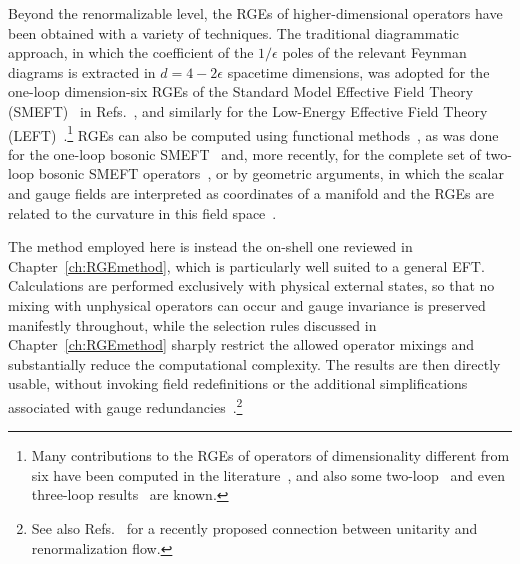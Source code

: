 Beyond the renormalizable level, the RGEs of higher-dimensional operators have been obtained with a
variety of techniques. The traditional diagrammatic approach, in which the coefficient of the
$1/\epsilon$ poles of the relevant Feynman diagrams is extracted in $d=4-2\epsilon$ spacetime
dimensions, was adopted for the one-loop dimension-six RGEs of the
Standard Model Effective Field Theory (SMEFT)~\cite{Buchmuller:1985jz,Grzadkowski:2010es,Brivio:2017vri,Isidori:2023pyp} in
Refs.~\cite{Jenkins:2013zja,Jenkins:2013wua,Alonso:2013hga,Alonso:2014zka}, and similarly for the
Low-Energy Effective Field Theory (LEFT)~\cite{Jenkins:2017dyc}.\footnote{Many contributions to the RGEs of operators of dimensionality
different from six have been computed in the
literature~\cite{Chankowski:1993tx,Babu:1993qv,Antusch:2001ck,Davidson:2018zuo,Liao:2016hru,Liao:2019tep,Zhang:2023kvw,Zhang:2023ndw,Chala:2021pll,DasBakshi:2022mwk,DasBakshi:2023htx,Chala:2023xjy,Jiang:2020mhe,Helset:2022pde,Assi:2023zid,Boughezal:2024zqa}, and also some
two-loop~\cite{Aebischer:2022anv,Ibarra:2024tpt,Aebischer:2025hsx,Naterop:2024cfx,Jenkins:2023bls,Jenkins:2023rtg,Born:2024mgz,DiNoi:2023ygk,DiNoi:2024ajj} and even three-loop
results~\cite{deVries:2019nsu} are known.}
RGEs can also be computed using functional
methods~\cite{Fuentes-Martin:2024agf}, as was done for the one-loop bosonic
SMEFT~\cite{Buchalla:2019wsc} and, more recently, for the complete set of two-loop bosonic SMEFT
operators~\cite{Born:2024mgz}, or by geometric arguments, in which the scalar and gauge fields are
interpreted as coordinates of a manifold and the RGEs are related to the curvature in this field
space~\cite{Helset:2022pde,Assi:2023zid,Jenkins:2023rtg,Jenkins:2023bls}.

The method employed here is instead the on-shell one reviewed in Chapter~\ref{ch:RGEmethod}, which is
particularly well suited to a general EFT. Calculations are performed
exclusively with physical external states, so that no mixing with unphysical operators can occur and
gauge invariance is preserved manifestly throughout, while the selection rules discussed in
Chapter~\ref{ch:RGEmethod} sharply restrict the allowed operator mixings and substantially reduce the
computational complexity. The results are then directly usable, without invoking field redefinitions
or the additional simplifications associated with gauge
redundancies~\cite{Baratella:2020lzz}.\footnote{See also Refs.~\cite{Chavda:2025aqm,Chavda:2025awr} for a recently
proposed connection between unitarity and renormalization flow.}

